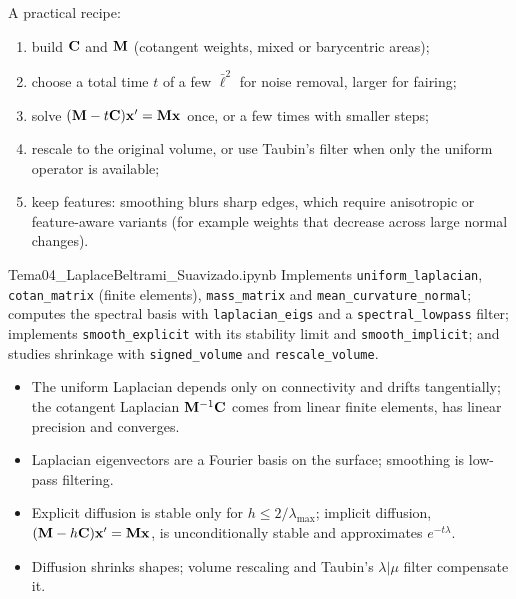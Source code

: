 A practical recipe:
\begin{enumerate}
  \item build $\mathbf{C}$ and $\mathbf{M}$ (cotangent weights, mixed or barycentric areas);
  \item choose a total time $t$ of a few $\bar\ell^2$ for noise removal, larger for fairing;
  \item solve $(\mathbf{M}-t\mathbf{C})\mathbf{x}'=\mathbf{M}\mathbf{x}$ once, or a few times with smaller steps;
  \item rescale to the original volume, or use Taubin's filter when only the uniform operator is
  available;
  \item keep features: smoothing blurs sharp edges, which require anisotropic or feature-aware
  variants (for example weights that decrease across large normal changes).
\end{enumerate}

\begin{notebook}{Tema04\_LaplaceBeltrami\_Suavizado.ipynb}
Implements \texttt{uniform\_laplacian}, \texttt{cotan\_matrix} (finite elements),
\texttt{mass\_matrix} and \texttt{mean\_curvature\_normal}; computes the spectral basis with
\texttt{laplacian\_eigs} and a \texttt{spectral\_lowpass} filter; implements
\texttt{smooth\_explicit} with its stability limit and \texttt{smooth\_implicit}; and studies
shrinkage with \texttt{signed\_volume} and \texttt{rescale\_volume}.
\end{notebook}

\begin{keypoints}
\begin{itemize}[leftmargin=*]
  \item The uniform Laplacian depends only on connectivity and drifts tangentially; the cotangent
  Laplacian $\mathbf{M}^{-1}\mathbf{C}$ comes from linear finite elements, has linear precision and converges.
  \item Laplacian eigenvectors are a Fourier basis on the surface; smoothing is low-pass filtering.
  \item Explicit diffusion is stable only for $h\le2/\lambda_{\max}$; implicit diffusion,
  $(\mathbf{M}-h\mathbf{C})\mathbf{x}'=\mathbf{M}\mathbf{x}$, is unconditionally stable and approximates $e^{-t\lambda}$.
  \item Diffusion shrinks shapes; volume rescaling and Taubin's $\lambda|\mu$ filter compensate it.
\end{itemize}
\end{keypoints}


